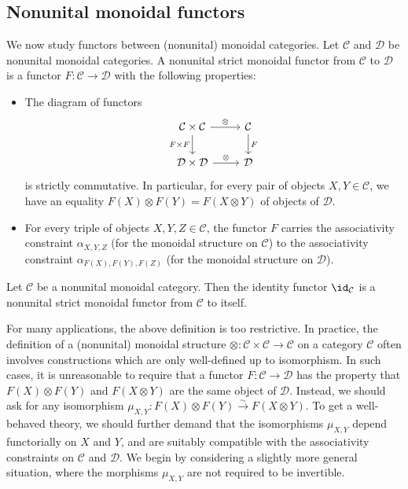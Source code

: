 \subsection{Nonunital monoidal functors}
We now study functors between (nonunital) monoidal categories. Let $\mathcal{C}$ and $\mathcal{D}$ be nonunital monoidal categories. A nonunital strict monoidal functor from $\mathcal{C}$ to $\mathcal{D}$ is a functor $F:\mathcal{C}\to\mathcal{D}$ with the following properties:
\begin{itemize}
\item The diagram of functors
\[\begin{tikzcd}
\mathcal{C}\times\mathcal{C}\ar[r,"\otimes"]\ar[d,swap,"F\times F"]&\mathcal{C}\ar[d,"F"]\\
\mathcal{D}\times\mathcal{D}\ar[r,"\otimes"]&\mathcal{D}
\end{tikzcd}\]
is strictly commutative. In particular, for every pair of objects $X,Y\in\mathcal{C}$, we have an equality $F(X)\otimes F(Y)=F(X\otimes Y)$ of objects of $\mathcal{D}$.
\item For every triple of objects $X,Y,Z\in\mathcal{C}$, the functor $F$ carries the associativity constraint $\alpha_{X,Y,Z}$ (for the monoidal structure on $\mathcal{C}$) to the associativity constraint $\alpha_{F(X),F(Y),F(Z)}$ (for the monoidal structure on $\mathcal{D}$).
\end{itemize}
\begin{example}
Let $\mathcal{C}$ be a nonunital monoidal category. Then the identity functor $\id_{\mathcal{C}}$ is a nonunital strict monoidal functor from $\mathcal{C}$ to itself.
\end{example}
For many applications, the above definition is too restrictive. In practice, the definition of a (nonunital) monoidal structure $\otimes:\mathcal{C}\times\mathcal{C}\to\mathcal{C}$ on a category $\mathcal{C}$ often involves constructions which are only well-defined up to isomorphism. In such cases, it is unreasonable to require that a functor $F:\mathcal{C}\to\mathcal{D}$ has the property that $F(X)\otimes F(Y)$ and $F(X\otimes Y)$ are the same object of $\mathcal{D}$. Instead, we should ask for any isomorphism $\mu_{X,Y}:F(X)\otimes F(Y)\stackrel{\sim}{\to}F(X\otimes Y)$. To get a well-behaved theory, we should further demand that the isomorphisms $\mu_{X,Y}$ depend functorially on $X$ and $Y$, and are suitably compatible with the associativity constraints on $\mathcal{C}$ and $\mathcal{D}$. We begin by considering a slightly more general situation, where the morphisms $\mu_{X,Y}$ are not required to be invertible.\par
